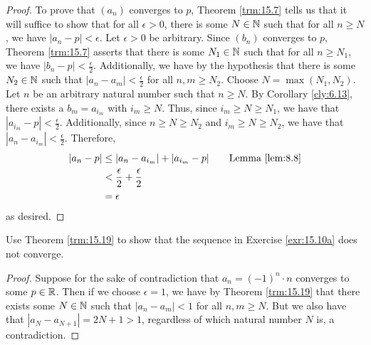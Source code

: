 \documentclass[../main.tex]{subfiles}
\begin{document}
\begin{theorem}
\begin{proof}
        To prove that $(a_n)$ converges to $p$, Theorem \ref{trm:15.7} tells us that it will suffice to show that for all $\epsilon>0$, there is some $N\in\mathbb{N}$ such that for all $n\geq N$, we have $|a_n-p|<\epsilon$. Let $\epsilon>0$ be arbitrary. Since $(b_n)$ converges to $p$, Theorem \ref{trm:15.7} asserts that there is some $N_1\in\mathbb{N}$ such that for all $n\geq N_1$, we have $|b_n-p|<\frac{\epsilon}{2}$. Additionally, we have by the hypothesis that there is some $N_2\in\mathbb{N}$ such that $|a_n-a_m|<\frac{\epsilon}{2}$ for all $n,m\geq N_2$. Choose $N=\max(N_1,N_2)$. Let $n$ be an arbitrary natural number such that $n\geq N$. By Corollary \ref{cly:6.13}, there exists a $b_m=a_{i_m}$ with $i_m\geq N$. Thus, since $i_m\geq N\geq N_1$, we have that $|a_{i_m}-p|<\frac{\epsilon}{2}$. Additionally, since $n\geq N\geq N_2$ and $i_m\geq N\geq N_2$, we have that $|a_n-a_{i_m}|<\frac{\epsilon}{2}$. Therefore,
        \begin{align*}
            |a_n-p| &\leq |a_n-a_{i_m}|+|a_{i_m}-p|\tag*{Lemma \ref{lem:8.8}}\\
            &< \frac{\epsilon}{2}+\frac{\epsilon}{2}\\
            &= \epsilon
        \end{align*}
        as desired.
    \end{proof}
\end{theorem}

\begin{theorem}\label{trm:15.20}
    Use Theorem \ref{trm:15.19} to show that the sequence in Exercise \ref{exr:15.10a} does not converge.
    \begin{proof}
        Suppose for the sake of contradiction that $a_n=(-1)^n\cdot n$ converges to some $p\in\mathbb{R}$. Then if we choose $\epsilon=1$, we have by Theorem \ref{trm:15.19} that there exists some $N\in\mathbb{N}$ such that $|a_n-a_m|<1$ for all $n,m\geq N$. But we also have that $|a_N-a_{N+1}|=2N+1>1$, regardless of which natural number $N$ is, a contradiction.
    \end{proof}
\end{theorem}
\end{document}
